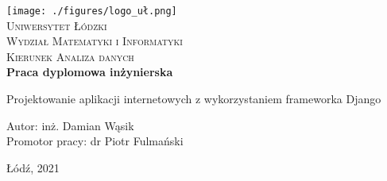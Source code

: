 
\newpage
\thispagestyle{empty}





\begin{onehalfspacing}
\begin{center}

\centering
\texttt{[image: ./figures/logo\_uł.png]} \\[.8cm]


{\fontsize{17}{17}\selectfont
\textsc{Uniwersytet Łódzki \\[.3cm]
Wydział Matematyki i Informatyki  \\[.3cm]
Kierunek Analiza danych  \\[2.5cm]}
\textbf{Praca dyplomowa inżynierska \\[1.7cm]}}



\large 
{Projektowanie aplikacji internetowych z wykorzystaniem frameworka Django} \\[2.3cm]


\large
\begin{flushleft}
Autor: inż. Damian Wąsik  \\
Promotor pracy:  dr Piotr Fulmański \\
\end{flushleft}

\vspace{3cm}
Łódź, 2021
\end{center}
\end{onehalfspacing}






\setcounter{page}{0} \pagestyle{plain}


\tableofcontents

\listoffigures
\listoftables



\pagestyle{fancy}